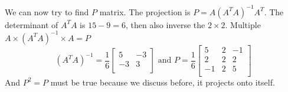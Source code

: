We can now try to find \(P\) matrix. The projection is \(P = A(A^T A)^{-1} A^T \). The determinant of \(A^T A\) is \(15 - 9 = 6\), then also inverse the \(2 \times 2\). Multiple \(A \times (A^T A)^{-1} \times A = P \)  
\[
    (A^T A)^{-1} = 
    \frac{1}{6}
    \begin{bmatrix}
        5 & -3  \\
        -3 & 3  \\
    \end{bmatrix}
    \text{ and }
    P = \frac{1}{6}
    \begin{bmatrix}
        5 & 2 & -1  \\
        2 & 2 & 2  \\
        -1 & 2 & 5  \\
    \end{bmatrix} 
\]    
And \(P^2 = P\) must be true because we discuss before, it projects onto itself. 

